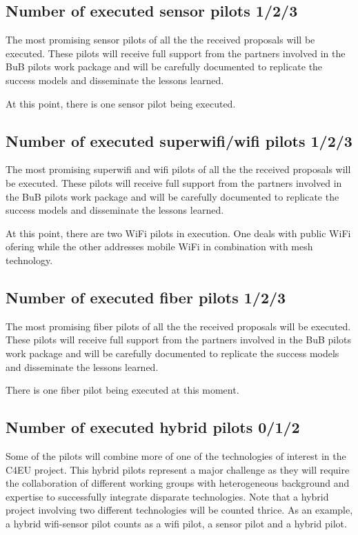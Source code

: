 \documentclass[draftclsnofoot,12pt,journal,onecolumn]{IEEEtran}
\begin{document}
\subsection{Number of executed sensor pilots 1/2/3}
The most promising sensor pilots of all the the received proposals
will be executed. These pilots will receive full support from the
partners involved in the BuB pilots work package and will be carefully
documented to replicate the success models and disseminate the lessons
learned.

At this point, there is one sensor pilot being executed.

\subsection{Number of executed superwifi/wifi pilots 1/2/3}
The most promising superwifi and wifi pilots of all the the received
proposals will be executed. These pilots will receive full support
from the partners involved in the BuB pilots work package and will be
carefully documented to replicate the success models and disseminate
the lessons learned.

At this point, there are two WiFi pilots in execution.
One deals with public WiFi ofering while the other addresses mobile WiFi in combination with mesh technology.

\subsection{Number of executed fiber pilots 1/2/3}
The most promising fiber pilots of all the the received proposals will
be executed. These pilots will receive full support from the partners
involved in the BuB pilots work package and will be carefully
documented to replicate the success models and disseminate the lessons
learned.

There is one fiber pilot being executed at this moment.

\subsection{ Number of executed hybrid pilots 0/1/2}
Some of the pilots will combine more of one of the technologies of
interest in the C4EU project. This hybrid pilots represent a major
challenge as they will require the collaboration of different working
groups with heterogeneous background and expertise to successfully
integrate disparate technologies. Note that a hybrid project involving
two different technologies will be counted thrice. As an example, a
hybrid wifi-sensor pilot counts as a wifi pilot, a sensor pilot and a
hybrid pilot.
\end{document}
